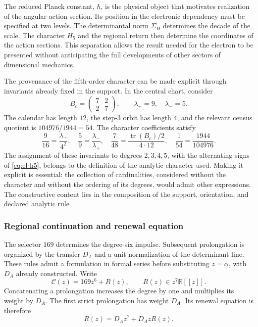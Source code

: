 The reduced Planck constant, \(\hbar\), is the physical object
that motivates realization of the angular-action section. Its position in
the electronic dependency must be specified at two levels. The determinantal
norm \(\Sigma_H\) determines the decade of the scale. The character
\(H_5\) and the regional return then determine the coordinates of the
action sections. This separation allows the result needed
for the electron to be presented without anticipating the full developments of
other sectors of dimensional mechanics.

The provenance of the fifth-order character can be made explicit through
invariants already fixed in the support. In the central chart, consider
\[
 B_c=\begin{pmatrix}7&2\\2&7\end{pmatrix},
 \qquad \lambda_+=9,\quad\lambda_-=5.
\]
The calendar has length \(12\), the step-\(3\) orbit has
length \(4\), and the relevant census quotient is
\(104976/1944=54\). The character coefficients satisfy
\begin{equation}
 \frac9{16}=\frac{\lambda_+}{4^2},\quad
 \frac59=\frac{\lambda_-}{\lambda_+},\quad
 \frac7{48}=\frac{\operatorname{tr}(B_c)/2}{4\cdot12},\quad
 \frac1{54}=\frac{1944}{104976}.
 \label{eq:revision-h5-coeficientes}
\end{equation}
The assignment of these invariants to degrees \(2,3,4,5\), with the
alternating signs of \eqref{eq:el-h5}, belongs to the definition of the
analytic character used. Making it explicit is essential: the collection of
cardinalities, considered without the character and without the ordering of its degrees,
would admit other expressions. The constructive content lies in the
composition of the support, orientation, and declared analytic rule.

\subsubsection{Regional continuation and renewal equation}

The selector \(169\) determines the degree-six impulse. Subsequent
prolongation is organized by the transfer \(D_A\) and a unit
normalization of the determinant line. These rules admit a formulation
in formal series before substituting \(z=\alpha\), with \(D_A\) already
constructed. Write
\[
 \mathscr C(z)=169z^6+R(z),\qquad R(z)\in z^7\mathbb R[[z]].
\]
Concatenating a prolongation increases the degree by one and
multiplies its weight by \(D_A\). The first strict prolongation has
weight \(D_A\). Its renewal equation is therefore
\begin{equation}
 R(z)=D_Az^7+D_AzR(z).
 \label{eq:revision-renovacion}
\end{equation}

